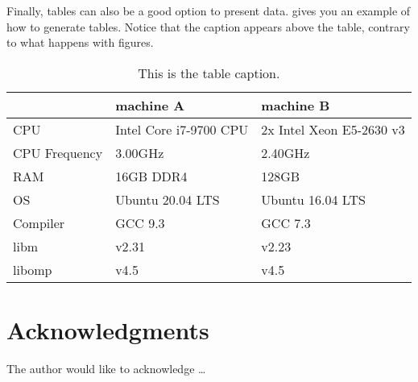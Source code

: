 \documentclass[sigconf,balance,nonacm,authordraft]{acmart}
\begin{document}
Finally, tables can also be a good option to present data.  gives you an example of how to generate tables. Notice that the caption appears above the table, contrary to what happens with figures.

\begin{table}[b]
\caption{This is the table caption.}
\label{tab:table1}
\footnotesize
\begin{tabular}{lll}
\toprule
         & machine A                   & machine B                           \\
\midrule
CPU      & Intel Core i7-9700 CPU      & 2x Intel Xeon E5-2630 v3            \\
CPU Frequency& 3.00GHz                     & 2.40GHz                             \\
RAM      & 16GB DDR4                   & 128GB                               \\
OS       & Ubuntu 20.04 LTS            & Ubuntu 16.04 LTS                    \\
Compiler & GCC 9.3                     & GCC 7.3                             \\
libm     & v2.31                       & v2.23                               \\
libomp   & v4.5                        & v4.5                                \\
\bottomrule
\end{tabular}
\end{table}

\section*{Acknowledgments}
The author would like to acknowledge \ldots



\end{document}
